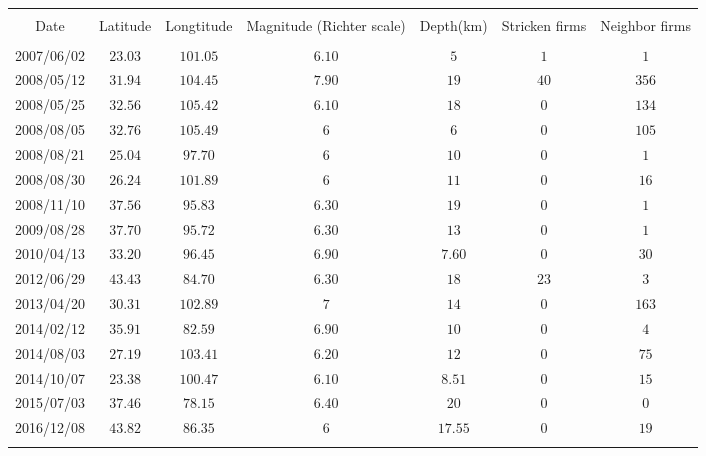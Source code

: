 
\begin{table}[!htbp] \centering 
  \caption{} 
  \label{} 
\begin{tabular}{@{\extracolsep{5pt}} ccccccc} 
\\[-1.8ex]\hline 
\hline \\[-1.8ex] 
Date & Latitude & Longtitude & Magnitude (Richter scale) & Depth(km) & Stricken firms & Neighbor firms \\ 
\hline \\[-1.8ex] 
2007/06/02 & $23.03$ & $101.05$ & $6.10$ & $5$ & $1$ & $1$ \\ 
2008/05/12 & $31.94$ & $104.45$ & $7.90$ & $19$ & $40$ & $356$ \\ 
2008/05/25 & $32.56$ & $105.42$ & $6.10$ & $18$ & $0$ & $134$ \\ 
2008/08/05 & $32.76$ & $105.49$ & $6$ & $6$ & $0$ & $105$ \\ 
2008/08/21 & $25.04$ & $97.70$ & $6$ & $10$ & $0$ & $1$ \\ 
2008/08/30 & $26.24$ & $101.89$ & $6$ & $11$ & $0$ & $16$ \\ 
2008/11/10 & $37.56$ & $95.83$ & $6.30$ & $19$ & $0$ & $1$ \\ 
2009/08/28 & $37.70$ & $95.72$ & $6.30$ & $13$ & $0$ & $1$ \\ 
2010/04/13 & $33.20$ & $96.45$ & $6.90$ & $7.60$ & $0$ & $30$ \\ 
2012/06/29 & $43.43$ & $84.70$ & $6.30$ & $18$ & $23$ & $3$ \\ 
2013/04/20 & $30.31$ & $102.89$ & $7$ & $14$ & $0$ & $163$ \\ 
2014/02/12 & $35.91$ & $82.59$ & $6.90$ & $10$ & $0$ & $4$ \\ 
2014/08/03 & $27.19$ & $103.41$ & $6.20$ & $12$ & $0$ & $75$ \\ 
2014/10/07 & $23.38$ & $100.47$ & $6.10$ & $8.51$ & $0$ & $15$ \\ 
2015/07/03 & $37.46$ & $78.15$ & $6.40$ & $20$ & $0$ & $0$ \\ 
2016/12/08 & $43.82$ & $86.35$ & $6$ & $17.55$ & $0$ & $19$ \\ 
\hline \\[-1.8ex] 
\end{tabular} 
\end{table} 
